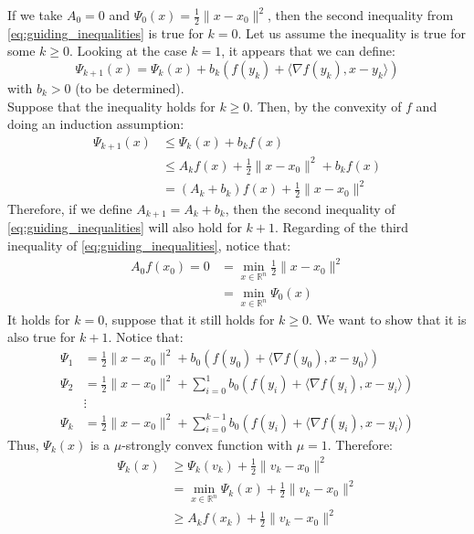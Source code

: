 \documentclass[12pt, openany]{report}
\newcommand{\R}{\mathbb{R}}
\theoremstyle{definition}
\begin{document}
If we take $A_0=0$ and $\Psi_0(x) = \frac{1}{2} \|x-x_0\|^2$, then the second inequality from \eqref{eq:guiding_inequalities} is true for $k=0$. Let us assume the inequality is true for some $k \geq 0$. Looking at the case $k=1$, it appears that we can define:
\begin{equation}
	\Psi_{k+1} (x) = \Psi_k(x) + b_k \left(f(y_k)+\langle \nabla f(y_k),x-y_k\rangle \right)
\end{equation}
with $b_k > 0$ (to be determined). \\
Suppose that the inequality holds for $k \geq 0$. Then, by the convexity of $f$ and doing an induction assumption:
\begin{equation}
	\begin{aligned}
		\Psi_{k+1}(x) &\leq \Psi_k(x) + b_k f(x)\\
		&\leq A_k f(x) + \frac{1}{2} \|x-x_0\|^2 +b_kf(x)\\
		&= (A_k+b_k)f(x) + \frac{1}{2} \|x-x_0\|^2
	\end{aligned}
\end{equation}
Therefore, if we define $A_{k+1}=A_k+b_k$, then the second inequality of \eqref{eq:guiding_inequalities} will also hold for $k+1$. Regarding of the third inequality of \eqref{eq:guiding_inequalities}, notice that:
\begin{equation}
	\begin{aligned}
		A_0f(x_0) = 0 &= \min_{x \in \R^n} \frac{1}{2} \|x-x_0\|^2\\
		&= 	\min_{x \in \R^n} \Psi_0(x)
	\end{aligned}
\end{equation}
It holds for $k=0$, suppose that it still holds for $k\geq 0$. We want to show that it is also true for $k+1$. Notice that:
\begin{equation}
	\begin{aligned}
		\Psi_1 &= \frac{1}{2} \|x-x_0\|^2 + b_0 \left(f(y_0)+ \langle \nabla f(y_0), x-y_0 \rangle\right)\\
		\Psi_2 &= \frac{1}{2} \|x-x_0\|^2 + \sum_{i=0}^{1} b_0 \left(f(y_i)+ \langle \nabla f(y_i), x-y_i \rangle\right)\\
		&\vdots\\
		\Psi_k &= \frac{1}{2} \|x-x_0\|^2 + \sum_{i=0}^{k-1} b_0 \left(f(y_i)+ \langle \nabla f(y_i), x-y_i \rangle\right)
	\end{aligned}
\end{equation}
Thus, $\Psi_k(x)$ is a $\mu$-strongly convex function with $\mu=1$. Therefore:
\begin{equation}
	\begin{aligned}
		\Psi_k(x) &\geq \Psi_k(v_k) + \frac{1}{2} \|v_k-x_0\|^2\\
		&= \min_{x\in\R^n} \Psi_k(x) + \frac{1}{2} \|v_k-x_0\|^2\\
		&\geq A_k f(x_k) + \frac{1}{2} \|v_k-x_0\|^2
	\end{aligned}
\end{equation}
\end{document}
